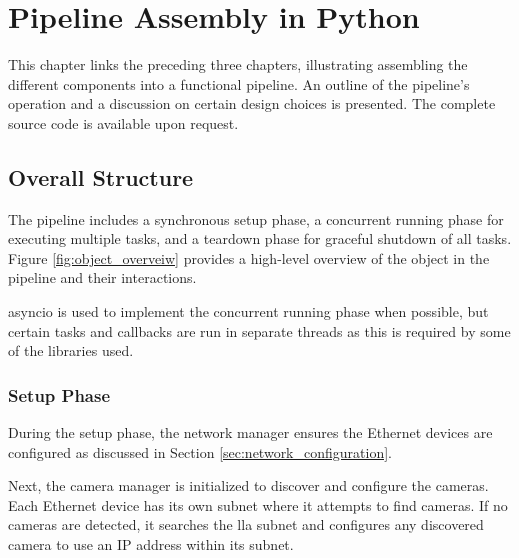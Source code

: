 
\chapter{Pipeline Assembly in Python}
\label{chap:pipeline}
This chapter links the preceding three chapters, illustrating assembling the different components into a functional pipeline.
An outline of the pipeline's operation and a discussion on certain design choices is presented.
The complete source code is available upon request.



\section{Overall Structure}
The pipeline includes a synchronous setup phase, a concurrent running phase for executing multiple tasks, and a teardown phase for graceful shutdown of all tasks.
Figure \ref{fig:object_overveiw} provides a high-level overview of the object in the pipeline and their interactions.

\gls{asyncio} is used to implement the concurrent running phase when possible, but certain tasks and callbacks are run in separate threads as this is required by some of the libraries used.


\subsection{Setup Phase}
\label{sec:discovery}

During the setup phase, the network manager ensures the Ethernet devices are configured as discussed in Section \ref{sec:network_configuration}.

Next, the camera manager is initialized to discover and configure the cameras.
Each Ethernet device has its own subnet where it attempts to find cameras.
If no cameras are detected, it searches the \gls{lla} subnet and configures any discovered camera to use an IP address within its subnet.

